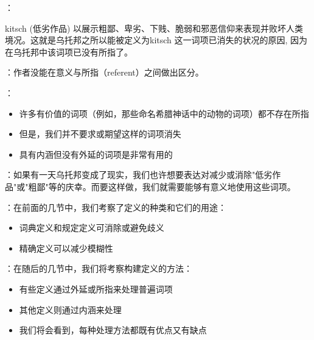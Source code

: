 \begin{examplebox}[title=乌托邦论证的谬误分析]
：
\begin{displayquote}
kitsch (低劣作品) 以展示粗鄙、卑劣、下贱、脆弱和邪恶信仰来表现并败坏人类境况。这就是乌托邦之所以能被定义为kitsch 这一词项已消失的状况的原因, 因为在乌托邦中该词项已没有所指了。\cite{sisk1988}
\end{displayquote}

：作者没能在意义与所指（referent）之间做出区分。

：
\begin{itemize}
  \item 许多有价值的词项（例如，那些命名希腊神话中的动物的词项）都不存在所指
  \item 但是，我们并不要求或期望这样的词项消失
  \item 具有内涵但没有外延的词项是非常有用的
\end{itemize}

：如果有一天乌托邦变成了现实，我们也许想要表达对减少或消除"低劣作品"或"粗鄙"等的庆幸。而要这样做，我们就需要能够有意义地使用这些词项。
\end{examplebox}

\begin{theorembox}[title=章节过渡]
：在前面的几节中，我们考察了定义的种类和它们的用途：
\begin{itemize}
  \item 词典定义和规定定义可消除或避免歧义
  \item 精确定义可以减少模糊性
\end{itemize}

：在随后的几节中，我们将考察构建定义的方法：
\begin{itemize}
  \item 有些定义通过外延或所指来处理普遍词项
  \item 其他定义则通过内涵来处理
  \item 我们将会看到，每种处理方法都既有优点又有缺点
\end{itemize}
\end{theorembox}


